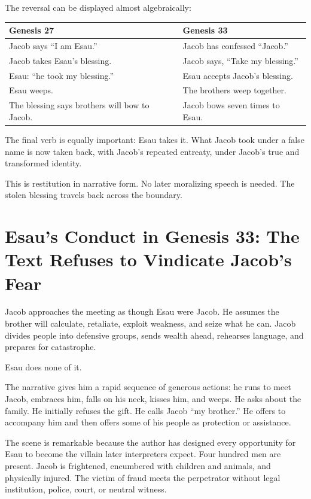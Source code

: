 The reversal can be displayed almost algebraically:

\begin{center}
\begin{tabularx}{0.94\textwidth}{@{}p{}p{}@{}}
\toprule
\textbf{Genesis 27} & \textbf{Genesis 33}\\
\midrule
Jacob says ``I am Esau.'' & Jacob has confessed ``Jacob.''\\
Jacob takes Esau's blessing. & Jacob says, ``Take my blessing.''\\
Esau: ``he took my blessing.'' & Esau accepts Jacob's blessing.\\
Esau weeps. & The brothers weep together.\\
The blessing says brothers will bow to Jacob. & Jacob bows seven times to Esau.\\
\bottomrule
\end{tabularx}
\end{center}

The final verb is equally important: Esau takes it. What Jacob took under a false name is now taken back, with Jacob's repeated entreaty, under Jacob's true and transformed identity.

This is restitution in narrative form. No later moralizing speech is needed. The stolen blessing travels back across the boundary.

\section{Esau's Conduct in Genesis 33: The Text Refuses to Vindicate Jacob's Fear}

Jacob approaches the meeting as though Esau were Jacob. He assumes the brother will calculate, retaliate, exploit weakness, and seize what he can. Jacob divides people into defensive groups, sends wealth ahead, rehearses language, and prepares for catastrophe.

Esau does none of it.

The narrative gives him a rapid sequence of generous actions: he runs to meet Jacob, embraces him, falls on his neck, kisses him, and weeps. He asks about the family. He initially refuses the gift. He calls Jacob ``my brother.'' He offers to accompany him and then offers some of his people as protection or assistance.

The scene is remarkable because the author has designed every opportunity for Esau to become the villain later interpreters expect. Four hundred men are present. Jacob is frightened, encumbered with children and animals, and physically injured. The victim of fraud meets the perpetrator without legal institution, police, court, or neutral witness.

